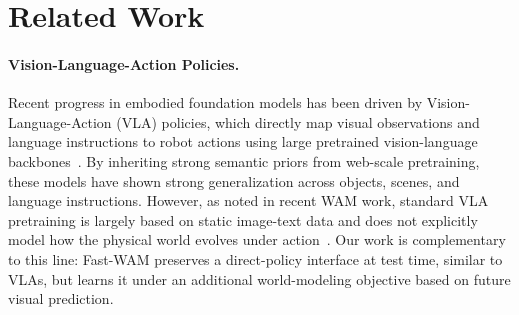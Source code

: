 \section{Related Work}

\paragraph{Vision-Language-Action Policies.}
Recent progress in embodied foundation models has been driven by Vision-Language-Action (VLA) policies, which directly map visual observations and language instructions to robot actions using large pretrained vision-language backbones~\cite{kim2024openvla, black2024pi_0, intelligence2025pi_, bjorck2025gr00t, zitkovich2023rt, liu2024rdt, bu2025agibot, shukor2025smolvla, team2025gemini, galaxea2025, wen2025dexvla}. By inheriting strong semantic priors from web-scale pretraining, these models have shown strong generalization across objects, scenes, and language instructions. However, as noted in recent WAM work, standard VLA pretraining is largely based on static image-text data and does not explicitly model how the physical world evolves under action~\cite{lingbot-va2026, ye2026worldactionmodelszeroshot}. Our work is complementary to this line: Fast-WAM preserves a direct-policy interface at test time, similar to VLAs, but learns it under an additional world-modeling objective based on future visual prediction.

